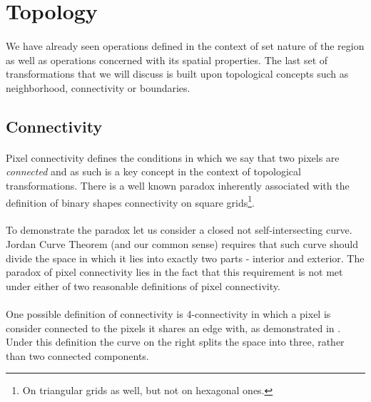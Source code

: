 \section{Topology}

\paragraph*{}
We have already seen operations defined in the context of set nature of the region as well as operations concerned with its spatial properties. The last set of transformations that we will discuss is built upon topological concepts such as neighborhood, connectivity or boundaries.

\subsection{Connectivity}

\paragraph*{}
Pixel connectivity defines the conditions in which we say that two pixels are \textit{connected} and as such is a key concept in the context of topological transformations. There is a well known paradox inherently associated with the definition of binary shapes connectivity on square grids\footnote{On triangular grids as well, but not on hexagonal ones.}.

\paragraph*{}
To demonstrate the paradox let us consider a closed not self-intersecting curve. Jordan Curve Theorem (and our common sense) requires that such curve should divide the space in which it lies into exactly two parts - interior and exterior. The paradox of pixel connectivity lies in the fact that this requirement is not met under either of two reasonable definitions of pixel connectivity.

\paragraph*{}
One possible definition of connectivity is 4-connectivity in which a pixel is consider connected to the pixels it shares an edge with, as demonstrated in . Under this definition the curve on the right splits the space into three, rather than two connected components.

